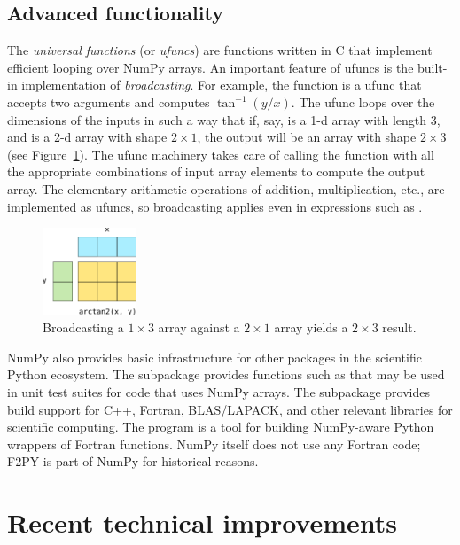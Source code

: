 \subsection{Advanced functionality}

The \emph{universal functions} (or \emph{ufuncs})
are functions written in C that implement efficient looping over
NumPy arrays. An important feature of ufuncs is the built-in
implementation of \emph{broadcasting}.  For example, the function
 is a ufunc that accepts two arguments and computes
$\tan^{-1}(y/x)$.  The ufunc loops over the dimensions of the inputs
in such a way that if, say,  is a 1-d array with length 3, and
 is a 2-d array with shape $2 \times 1$, the output will be
an array with shape $2 \times 3$ (see Figure~\ref{fig:broadcasting}).  The ufunc machinery takes care
of calling the function with all the appropriate combinations of
input array elements to compute the output array.
The elementary arithmetic operations of addition, multiplication, etc.,
are implemented as ufuncs, so broadcasting applies even in expressions
such as .

\begin{figure}
  \centering
  \includegraphics[width=0.25\textwidth]{static/broadcasting}
  \caption{
    Broadcasting a $1 \times 3$ array against a $2 \times 1$ array
    yields a $2 \times 3$ result.
  }
  \label{fig:broadcasting}
\end{figure}

NumPy also provides basic infrastructure for other packages in the scientific
Python ecosystem.
The  subpackage provides functions such as
 that may be used in unit
test suites for code that uses NumPy arrays.
The  subpackage provides build support for C++, Fortran,
BLAS/LAPACK, and other relevant libraries for scientific computing.
The program  is a tool for
building NumPy-aware Python wrappers of Fortran functions.
NumPy itself does not use any Fortran code;  F2PY is part of NumPy
for historical reasons.

\section{Recent technical improvements}

